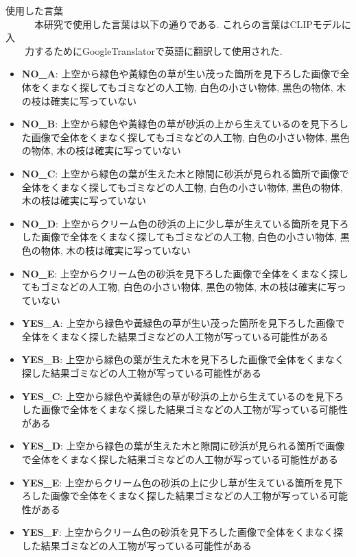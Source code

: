 \documentclass[a4paper, 12pt]{report}
\begin{document}
使用した言葉\\
　　　本研究で使用した言葉は以下の通りである. これらの言葉はCLIPモデルに入\\
　　力するためにGoogleTranslatorで英語に翻訳して使用された. 
\begin{itemize}
    \item \textbf{NO\_A}: 上空から緑色や黃緑色の草が生い茂った箇所を見下ろした画像で全体をくまなく探してもゴミなどの人工物, 白色の小さい物体, 黒色の物体, 木の枝は確実に写っていない
    \item \textbf{NO\_B}: 上空から緑色や黃緑色の草が砂浜の上から生えているのを見下ろした画像で全体をくまなく探してもゴミなどの人工物, 白色の小さい物体, 黒色の物体, 木の枝は確実に写っていない
    \item \textbf{NO\_C}: 上空から緑色の葉が生えた木と隙間に砂浜が見られる箇所で画像で全体をくまなく探してもゴミなどの人工物, 白色の小さい物体, 黒色の物体, 木の枝は確実に写っていない
    \item \textbf{NO\_D}: 上空からクリーム色の砂浜の上に少し草が生えている箇所を見下ろした画像で全体をくまなく探してもゴミなどの人工物, 白色の小さい物体, 黒色の物体, 木の枝は確実に写っていない
    \item \textbf{NO\_E}: 上空からクリーム色の砂浜を見下ろした画像で全体をくまなく探してもゴミなどの人工物, 白色の小さい物体, 黒色の物体, 木の枝は確実に写っていない
    \item \textbf{YES\_A}: 上空から緑色や黃緑色の草が生い茂った箇所を見下ろした画像で全体をくまなく探した結果ゴミなどの人工物が写っている可能性がある
    \item \textbf{YES\_B}: 上空から緑色の葉が生えた木を見下ろした画像で全体をくまなく探した結果ゴミなどの人工物が写っている可能性がある
    \item \textbf{YES\_C}: 上空から緑色や黃緑色の草が砂浜の上から生えているのを見下ろした画像で全体をくまなく探した結果ゴミなどの人工物が写っている可能性がある
    \item \textbf{YES\_D}: 上空から緑色の葉が生えた木と隙間に砂浜が見られる箇所で画像で全体をくまなく探した結果ゴミなどの人工物が写っている可能性がある
    \item \textbf{YES\_E}: 上空からクリーム色の砂浜の上に少し草が生えている箇所を見下ろした画像で全体をくまなく探した結果ゴミなどの人工物が写っている可能性がある
    \item \textbf{YES\_F}: 上空からクリーム色の砂浜を見下ろした画像で全体をくまなく探した結果ゴミなどの人工物が写っている可能性がある
\end{itemize}
\end{document}
